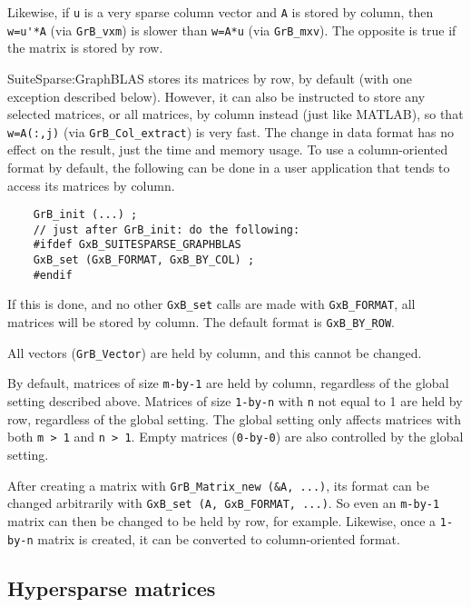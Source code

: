 \documentclass[12pt]{article}
\begin{document}
Likewise, if \verb'u' is a very sparse column vector and \verb'A' is stored by
column, then \verb"w=u'*A" (via \verb'GrB_vxm') is slower than \verb'w=A*u'
(via \verb'GrB_mxv').  The opposite is true if the matrix is stored by row.

SuiteSparse:GraphBLAS stores its matrices by row, by default (with one
exception described below).  However, it can also be instructed to store any
selected matrices, or all matrices, by column instead (just like MATLAB), so
that \verb'w=A(:,j)' (via \verb'GrB_Col_extract') is very fast.  The change in
data format has no effect on the result, just the time and memory usage.  To
use a column-oriented format by default, the following can be done in a user
application that tends to access its matrices by column.

    {\footnotesize
    \begin{verbatim}
    GrB_init (...) ;
    // just after GrB_init: do the following:
    #ifdef GxB_SUITESPARSE_GRAPHBLAS
    GxB_set (GxB_FORMAT, GxB_BY_COL) ;
    #endif \end{verbatim} }

If this is done, and no other \verb'GxB_set' calls are made with
\verb'GxB_FORMAT', all matrices will be stored by column.
The default format is \verb'GxB_BY_ROW'.

All vectors (\verb'GrB_Vector') are held by column, and this cannot be changed.

By default, matrices of size \verb'm-by-1' are held by column, regardless of
the global setting described above.  Matrices of size \verb'1-by-n' with
\verb'n' not equal to 1 are held by row, regardless of the global setting.
The global setting only affects matrices with both \verb'm > 1' and \verb'n > 1'.
Empty matrices (\verb'0-by-0') are also controlled by the global setting.

After creating a matrix with \verb'GrB_Matrix_new (&A, ...)',
its format can be changed arbitrarily with \verb'GxB_set (A, GxB_FORMAT, ...)'.
So even an \verb'm-by-1' matrix can then be changed to be held by row, for
example.  Likewise, once a \verb'1-by-n' matrix is created, it can be converted
to column-oriented format.

\subsection{Hypersparse matrices}
\label{hypersparse}
\end{document}
